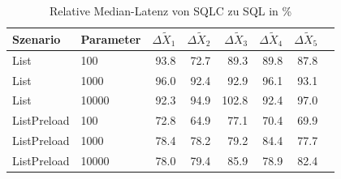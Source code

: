 
\begin{table}[ht]
\setlength{\extrarowheight}{-1pt}
\centering
\caption{Relative Median-Latenz von SQLC zu SQL in \%}
\begin{tabular}{llrrrrrr}
\toprule
Szenario & Parameter & ${\Delta \tilde{X}_1}$ & ${\Delta \tilde{X}_2}$ & ${\Delta \tilde{X}_3}$ & ${\Delta \tilde{X}_4}$ & ${\Delta \tilde{X}_5}$ \\
\midrule
	List & 100 & \cellcolor{green!12}  93.8 & \cellcolor{green!21}  72.7 & \cellcolor{green!14}  89.3 & \cellcolor{green!14}  89.8 & \cellcolor{green!15}  87.8 \\
	List & 1000 & \cellcolor{green!12}  96.0 & \cellcolor{green!13}  92.4 & \cellcolor{green!13}  92.9 & \cellcolor{green!12}  96.1 & \cellcolor{green!13}  93.1 \\
	List & 10000 & \cellcolor{green!13}  92.3 & \cellcolor{green!12}  94.9 & \cellcolor{red!11}  102.8 & \cellcolor{green!13}  92.4 & \cellcolor{green!11}  97.0 \\
	ListPreload & 100 & \cellcolor{green!21}  72.8 & \cellcolor{green!24}  64.9 & \cellcolor{green!19}  77.1 & \cellcolor{green!22}  70.4 & \cellcolor{green!22}  69.9 \\
	ListPreload & 1000 & \cellcolor{green!19}  78.4 & \cellcolor{green!19}  78.2 & \cellcolor{green!18}  79.2 & \cellcolor{green!16}  84.4 & \cellcolor{green!19}  77.7 \\
	ListPreload & 10000 & \cellcolor{green!19}  78.0 & \cellcolor{green!18}  79.4 & \cellcolor{green!16}  85.9 & \cellcolor{green!18}  78.9 & \cellcolor{green!17}  82.4 \\
\bottomrule
\end{tabular}
\label{tab:relativer_durchsatz_sqlc}
\end{table}
	